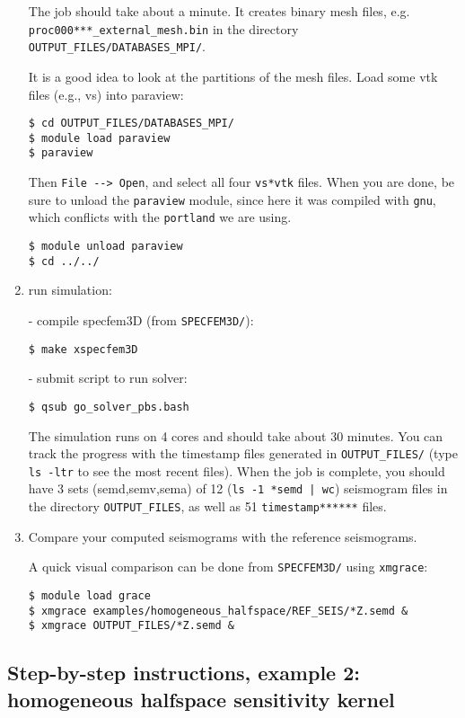 \documentclass[10pt,fleqn,letterpaper]{article}
\begin{document}
\begin{enumerate}
The job should take about a minute.
It creates binary mesh files, e.g. \verb+proc000***_external_mesh.bin+ in the directory \verb+OUTPUT_FILES/DATABASES_MPI/+.

It is a good idea to look at the partitions of the mesh files. Load some vtk files (e.g., vs) into paraview:
\begin{lstlisting}
$ cd OUTPUT_FILES/DATABASES_MPI/
$ module load paraview
$ paraview
\end{lstlisting}
%
Then \verb+File --> Open+, and select all four \verb+vs*vtk+ files. When you are done, be sure to unload the \verb+paraview+ module, since here it was compiled with \verb+gnu+, which conflicts with the \verb+portland+ we are using.
%
\begin{lstlisting}
$ module unload paraview
$ cd ../../
\end{lstlisting}

\item run simulation:

   - compile specfem3D (from \verb+SPECFEM3D/+):
\begin{lstlisting}
$ make xspecfem3D
\end{lstlisting}
   - submit script to run solver:
\begin{lstlisting}
$ qsub go_solver_pbs.bash
\end{lstlisting}

The simulation runs on 4 cores and should take about 30 minutes. You can track the progress with the timestamp files generated in \verb+OUTPUT_FILES/+ (type \verb+ls -ltr+ to see the most recent files). When the job is complete, you should have 3 sets (semd,semv,sema) of 12 (\verb+ls -1 *semd | wc+) seismogram files in the directory \verb+OUTPUT_FILES+, as well as 51 \verb+timestamp******+ files.

\item Compare your computed seismograms with the reference seismograms.

A quick visual comparison can be done from \verb+SPECFEM3D/+ using \verb+xmgrace+:
\begin{lstlisting}
$ module load grace
$ xmgrace examples/homogeneous_halfspace/REF_SEIS/*Z.semd &
$ xmgrace OUTPUT_FILES/*Z.semd &
\end{lstlisting}

\end{enumerate}


\subsection*{Step-by-step instructions, example 2: homogeneous halfspace sensitivity kernel}
\end{document}
